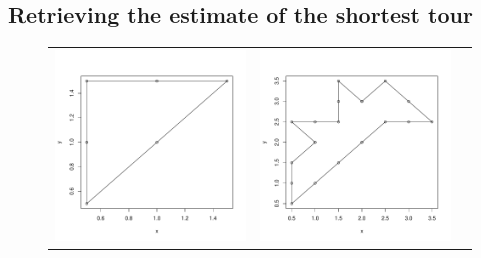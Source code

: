 \subsection{Retrieving the estimate of the shortest tour}
\begin{figure}[t]
\begin{center}
\begin{tabular}{ccc}
\includegraphics[scale=0.25]{fig/it2.pdf} &
\includegraphics[scale=0.25]{fig/it4.pdf} \\

\end{tabular}
\end{center}
\end{figure}
